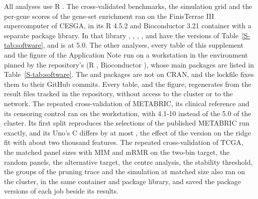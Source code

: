 All analyses use R \SuppLockR. The cross-validated benchmarks, the simulation grid and
the per-gene scores of the gene-set enrichment ran on the FinisTerrae III supercomputer
of CESGA, in its R 4.5.2 and Bioconductor 3.21 container with a separate package library.
In that library , , , ,
 and  have the versions of Table~\ref{S-tab:software}, and
 is at 5.0. The other analyses, every table of this supplement and the
figure of the Application Note run on a workstation in the environment pinned
by the repository's  (R \SuppLockR, Bioconductor \SuppLockBioc), whose
main packages are listed in Table~\ref{S-tab:software}. The  and 
packages are not on CRAN, and the lockfile fixes them to their GitHub commits. Every
table, and the figure, regenerates from the result files tracked in the repository, without
access to the cluster or to the network. The repeated cross-validation of METABRIC, its
clinical reference and its censoring control ran on the workstation, with 
4.1-10 instead of the 5.0 of the cluster. Its first split reproduces the selections of the
published METABRIC run exactly, and its Uno's C differs by at most
\SuppMetabricGlmnetDiff, the effect of the  version on the ridge fit with about
two thousand features. The repeated cross-validation of TCGA, the matched panel sizes
with MIM and mRMR on the two-bin target, the random panels, the alternative target, the
centre analysis, the stability threshold, the groups of the pruning trace and the
simulation at matched size also ran on the cluster, in the same container and package
library, and  saved the package versions of each job beside its
results.

